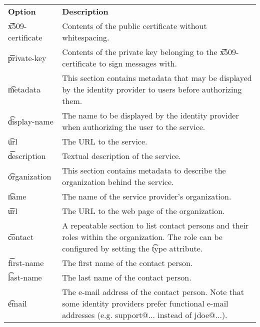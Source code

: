 \begin{tabularx}{\textwidth}{*{1}{!{\VRule[-1pt]}l}!{\VRule[-1pt]}X}
  \headrow
  \textbf{Option}              & \textbf{Description}\\
  \t{x509-certificate}         & Contents of the public certificate without
                                 whitespacing.\\
  \t{private-key}              & Contents of the private key belonging to the
                                 \t{x509-certificate} to sign messages with.\\
  \t{metadata}                 & This section contains metadata that may be
                                 displayed by the identity provider to users
                                 before authorizing them.\\
  \cfgindent\t{display-name}   & The name to be displayed by the identity
                                 provider when authorizing the user to the
                                 service.\\
  \cfgindent\t{url}            & The URL to the service.\\
  \cfgindent\t{description}    & Textual description of the service.\\
  \cfgindent\t{organization}   & This section contains metadata to describe the
                                organization behind the service.\\
  \cfgindent\cfgindent\t{name} & The name of the service provider's organization.\\
  \cfgindent\cfgindent\t{url}  & The URL to the web page of the organization.\\
  \cfgindent\t{contact}        & A repeatable section to list contact persons
                                 and their roles within the organization. The
                                 role can be configured by setting the \t{type}
                                 attribute.\\
  \cfgindent\cfgindent\t{first-name} & The first name of the contact person.\\
  \cfgindent\cfgindent\t{last-name} & The last name of the contact person.\\
  \cfgindent\cfgindent\t{email} & The e-mail address of the contact person.
                                  Note that some identity providers prefer
                                  functional e-mail addresses (e.g. support@...
                                  instead of jdoe@...).
\end{tabularx}


